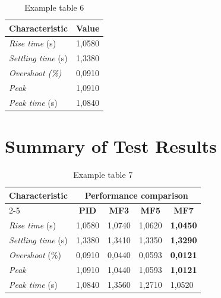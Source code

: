 \lipsum[1]

\begin{table}[H]
    \centering
    \caption{Example table 6}
    \label{t karPID}
    \begin{tabular}{ll}
        \hline
        Characteristic & Value \\ \hline
        \textit{Rise time} (s)     & 1,0580     \\
        \textit{Settling time} (s) & 1,3380     \\
        \textit{Overshoot (\%)}    & 0,0910     \\
        \textit{Peak}              & 1,0910     \\
        \textit{Peak time} (s)     & 1,0840     \\ \hline
    \end{tabular}
\end{table}

\section{Summary of Test Results}
\lipsum[1]

\begin{table}[H]
    \centering
    \caption{Example table 7}
    \label{t perbandinganRespon}
    \begin{tabular}{lllll}
        \hline
        \multirow{2}{*}{Characteristic} & \multicolumn{4}{c}{Performance comparison} \\ \cline{2-5} 
        & \multicolumn{1}{c}{\textbf{PID}} & \multicolumn{1}{c}{\textbf{MF3}} & \multicolumn{1}{c}{\textbf{MF5}} & \multicolumn{1}{c}{\textbf{MF7}} \\ \hline
        \textit{Rise time} (s)  & 1,0580  & 1,0740  & 1,0620    & \textbf{1,0450} \\
        \textit{Settling time} (s) & 1,3380 & 1,3410  & 1,3350  & \textbf{1,3290} \\
        \textit{Overshoot} (\%) & 0,0910 & 0,0440  & 0,0593     & \textbf{0,0121} \\
        \textit{Peak} & 1,0910 & 1,0440 & 1,0593 & \textbf{1,0121} \\
        \textit{Peak time} (s) & 1,0840 & 1,3560  & 1,2710      & 1,0520  \\ \hline
    \end{tabular}
\end{table}
